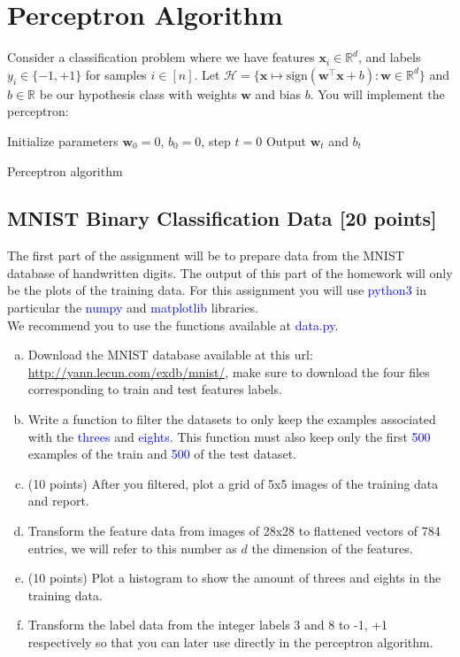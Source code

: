 \newpage
\section{Perceptron Algorithm}


Consider a classification problem where we have features $\mathbf{x}_{i}\in \mathbb{R}^{d}$, and labels $y_{i}\in \{-1, +1\}$ for samples $i \in [n]$. Let $\mathcal{H} = \{ \mathbf{x} \mapsto \text{sign}(\mathbf{w}^\top \mathbf{x}+b): \mathbf{w} \in \mathbb{R}^d \}$ and $b\in \mathbb{R}$ be our hypothesis class with weights $\mathbf{w}$ and bias $b$. You will implement the perceptron:\\

\begin{algorithm}[H]
\SetAlgoLined
Initialize parameters $\mathbf{w}_{0}=0$, $b_{0}=0$, step $t=0$\;
 Output $\mathbf{w}_t$ and $b_t$
 \caption{Perceptron algorithm}
\end{algorithm}

\subsection{MNIST Binary Classification Data [20 points]}

The first part of the assignment will be to prepare data from the MNIST database of handwritten digits. The output of this part of the homework will only be the plots of the training data. For this assignment you will use \textcolor{blue}{python3} in particular the \textcolor{blue}{numpy} and \textcolor{blue}{matplotlib} libraries.\\

We recommend you to use the functions available at \textcolor{blue}{data.py}.

\begin{enumerate}[(a)]
    \item Download the MNIST database available at this url: \url{http://yann.lecun.com/exdb/mnist/}, make sure to download the four files corresponding to train and test features labels.
    \item Write a function to filter the datasets to only keep  the examples associated with the \textcolor{blue}{threes} and \textcolor{blue}{eights}. This function must also keep only the first \textcolor{blue}{500} examples of the train and \textcolor{blue}{500} of the test dataset.
    \item (10 points) After you filtered, plot a grid of 5x5 images of the training data and report.
    \item Transform the feature data from images of 28x28 to flattened vectors of 784 entries, we will refer to this number as $d$ the dimension of the features.
    \item (10 points) Plot a histogram to show the amount of threes and eights in the training data.
    \item Transform the label data from the integer labels 3 and 8 to -1, +1 respectively so that you can later use directly in the perceptron algorithm.
\end{enumerate}

